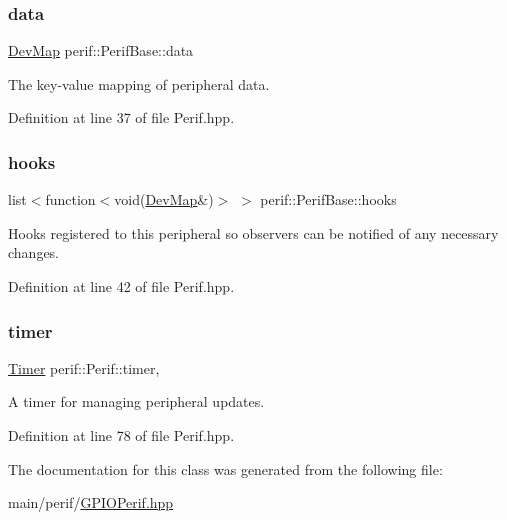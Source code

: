 \subsubsection{\texorpdfstring{data}{data}}
{\footnotesize\ttfamily \mbox{\hyperlink{Perif_8hpp_a358ff4ee6d24694ee7661f0cce14377e}{Dev\+Map}} perif\+::\+Perif\+Base\+::data\hspace{0.3cm}{\ttfamily [inherited]}}

The key-\/value mapping of peripheral data. 

Definition at line 37 of file Perif.\+hpp.

\mbox{\label{classperif_1_1PerifBase_a98964e5ca8384df64881265e0aa6d7b6}} 
\subsubsection{\texorpdfstring{hooks}{hooks}}
{\footnotesize\ttfamily list$<$function$<$void(\mbox{\hyperlink{Perif_8hpp_a358ff4ee6d24694ee7661f0cce14377e}{Dev\+Map}}\&)$>$ $>$ perif\+::\+Perif\+Base\+::hooks\hspace{0.3cm}{\ttfamily [inherited]}}

Hooks registered to this peripheral so observers can be notified of any necessary changes. 

Definition at line 42 of file Perif.\+hpp.

\mbox{\label{classperif_1_1Perif_acfa1256201bead82ccce1a0a8bcc24e1}} 
\subsubsection{\texorpdfstring{timer}{timer}}
{\footnotesize\ttfamily \mbox{\hyperlink{classTimer}{Timer}} perif\+::\+Perif\+::timer\hspace{0.3cm}{\ttfamily [protected]}, {\ttfamily [inherited]}}

A timer for managing peripheral updates. 

Definition at line 78 of file Perif.\+hpp.



The documentation for this class was generated from the following file\+:\begin{DoxyCompactItemize}
\item 
main/perif/\mbox{\hyperlink{GPIOPerif_8hpp}{G\+P\+I\+O\+Perif.\+hpp}}\end{DoxyCompactItemize}
